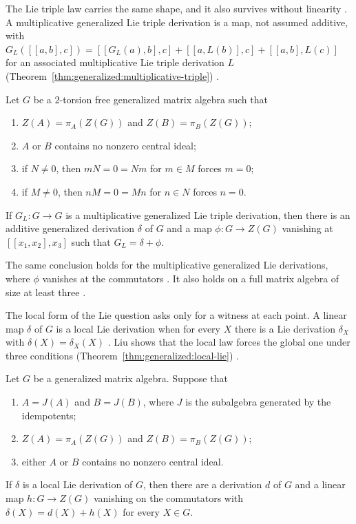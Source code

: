 The Lie triple law carries the same shape, and it also survives without
linearity \cite[Theorem~2.1, p.~3]{Jabeen2019}. A multiplicative generalized Lie
triple derivation is a map, not assumed additive, with
$G_L([[a,b],c])=[[G_L(a),b],c]+[[a,L(b)],c]+[[a,b],L(c)]$ for an associated
multiplicative Lie triple derivation $L$ (Theorem~\ref{thm:generalized:multiplicative-triple}) \cite[p.~1]{Jabeen2019}.

\begin{theorem}\label{thm:generalized:multiplicative-triple}
Let $G$ be a $2$-torsion free generalized matrix algebra such that
\begin{enumerate}
\item $Z(A)=\pi_A(Z(G))$ and $Z(B)=\pi_B(Z(G))$;
\item $A$ or $B$ contains no nonzero central ideal;
\item if $N\neq0$, then $mN=0=Nm$ for $m\in M$ forces $m=0$;
\item if $M\neq0$, then $nM=0=Mn$ for $n\in N$ forces $n=0$.
\end{enumerate}
If $G_L\colon G\to G$ is a multiplicative generalized Lie triple derivation,
then there is an additive generalized derivation $\delta$ of $G$ and a map
$\phi\colon G\to Z(G)$ vanishing at $[[x_1,x_2],x_3]$ such that
$G_L=\delta+\phi$.
\end{theorem}

The same conclusion holds for the multiplicative generalized Lie derivations,
where $\phi$ vanishes at the commutators \cite[Corollary~3.1, p.~13]{Jabeen2019}.
It also holds on a full matrix algebra of size at least three
\cite[Corollary~3.2, p.~13]{Jabeen2019}.

The local form of the Lie question asks only for a witness at each point. A
linear map $\delta$ of $G$ is a local Lie derivation when for every $X$ there
is a Lie derivation $\delta_X$ with $\delta(X)=\delta_X(X)$
\cite[p.~2]{Liu2021LocalLie}. Liu shows that the local law forces the
global one under three conditions (Theorem~\ref{thm:generalized:local-lie}) \cite[Theorem~2.1, p.~3]{Liu2021LocalLie}.

\begin{theorem}\label{thm:generalized:local-lie}
Let $G$ be a generalized matrix algebra. Suppose that
\begin{enumerate}
\item $A=J(A)$ and $B=J(B)$, where $J$ is the subalgebra generated by the
idempotents;
\item $Z(A)=\pi_A(Z(G))$ and $Z(B)=\pi_B(Z(G))$;
\item either $A$ or $B$ contains no nonzero central ideal.
\end{enumerate}
If $\delta$ is a local Lie derivation of $G$, then there are a derivation $d$ of
$G$ and a linear map $h\colon G\to Z(G)$ vanishing on the commutators with
$\delta(X)=d(X)+h(X)$ for every $X\in G$.
\end{theorem}


